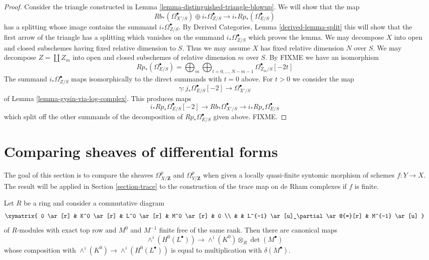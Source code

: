 \begin{proof}
Consider the triangle constructed in
Lemma \ref{lemma-distinguished-triangle-blowup}.
We will show that the map
$$
Rb_*(\Omega^\bullet_{X'/S}) \oplus i_*\Omega^\bullet_{Z/S} \to
i_*Rp_*(\Omega^\bullet_{E/S})
$$
has a splitting whose image contains the summand $i_*\Omega^\bullet_{Z/S}$.
By Derived Categories, Lemma \ref{derived-lemma-split} this will show that
the first arrow of the triangle has a splitting which vanishes on
the summand $i_*\Omega^\bullet_{Z/S}$ which proves the lemma.
We may decompose $X$ into open and closed subschemes
having fixed relative dimension to $S$. Thus we may assume $X$ has
fixed relative dimension $N$ over $S$. We may decompose
$Z = \coprod Z_m$ into open and closed subschemes of relative
dimension $m$ over $S$. By FIXME we have an isomorphism
$$
Rp_*(\Omega^\bullet_{E/S}) =
\bigoplus\nolimits_m
\bigoplus\nolimits_{t = 0, \ldots, N - m - 1}
\Omega^\bullet_{Z_m/S}[-2t]
$$
The summand $i_*\Omega^\bullet_{Z/S}$ maps isomorphically to
the direct summands with $t = 0$ above. For $t > 0$ we consider
the map
$$
\gamma : j_*\Omega^\bullet_{E/S}[-2] \longrightarrow \Omega^\bullet_{X'/S}
$$
of Lemma \ref{lemma-gysin-via-log-complex}. This produces maps
$$
i_*Rp_*\Omega^\bullet_{E/S}[-2] \to
Rb_*\Omega^\bullet_{X'/S} \to
i_*Rp_*\Omega^\bullet_{E/S}
$$
which split off the other summands of the decomposition
of $Rp_*\Omega^\bullet_{E/S}$ given above. FIXME.
\end{proof}















\section{Comparing sheaves of differential forms}
\label{section-quasi-finite-syntomic}

\noindent
The goal of this section is to compare the sheaves
$\Omega^p_{X/\mathbf{Z}}$ and $\Omega^p_{Y/\mathbf{Z}}$
when given a locally quasi-finite syntomic morphism of schemes $f : Y \to X$.
The result will be applied in Section \ref{section-trace}
to the construction of the trace map on de Rham complexes if $f$ is finite.

\begin{lemma}
\label{lemma-funny-map}
Let $R$ be a ring and consider a commutative diagram
$$
\xymatrix{
0 \ar[r] &
K^0 \ar[r] &
L^0 \ar[r] &
M^0 \ar[r] & 0 \\
& & L^{-1} \ar[u]_\partial \ar@{=}[r] &
M^{-1} \ar[u]
}
$$
of $R$-modules with exact top row and $M^0$ and $M^{-1}$
finite free of the same rank. Then there are canonical maps
$$
\wedge^i(H^0(L^\bullet)) \longrightarrow \wedge^i(K^0) \otimes_R \det(M^\bullet)
$$
whose composition with $\wedge^i(K^0) \to \wedge^i(H^0(L^\bullet))$
is equal to multiplication with $\delta(M^\bullet)$.
\end{lemma}

